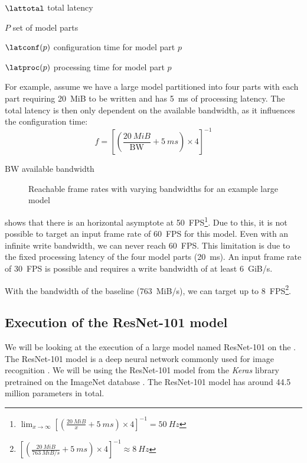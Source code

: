 \begin{eqexpl}[15mm]
    \item{$\lattotal$} total latency
    \item{$P$} set of model parts
    \item{$\latconf(p)$} configuration time for model part $p$
    \item{$\latproc(p)$} processing time for model part $p$
\end{eqexpl}

For example, assume we have a large model partitioned into four parts with each part requiring \SI{20}{MiB} to be written and has \SI{5}{ms} of processing latency.
The total latency is then only dependent on the available bandwidth, as it influences the configuration time:
\begin{equation*}
    f = \left[ \left( \frac{\SI{20}{MiB}}{\textrm{BW}} + \SI{5}{ms} \right) \times 4 \right]^{-1}
\end{equation*}

\begin{eqexpl}[15mm]
    \item{$\textrm{BW}$} available bandwidth
\end{eqexpl}

\begin{figure}
    \centering
    
    \caption{Reachable frame rates with varying bandwidths for an example large model}
    \label{fig:large_model_bandwidth_analysis_example}
\end{figure}

 shows that there is an horizontal asymptote at \SI{50}{FPS}\footnote{ $\lim_{x \to \infty} \left[ \left( \frac{\SI{20}{MiB}}{x} + \SI{5}{ms} \right) \times 4 \right]^{-1} = \SI{50}{Hz}$}.
Due to this, it is not possible to target an input frame rate of \SI{60}{FPS} for this model.
Even with an infinite write bandwidth, we can never reach \SI{60}{FPS}.
This limitation is due to the fixed processing latency of the four model parts (\SI{20}{ms}).
An input frame rate of \SI{30}{FPS} is possible and requires a write bandwidth of at least \SI{6}{GiB/s}.

With the bandwidth of the baseline \confignoc{} (\SI{763}{MiB/s}), we can target up to \SI{8}{FPS}\footnote{$\left[ \left( \frac{\SI{20}{MiB}}{\SI{763}{MiB/s}} + \SI{5}{ms} \right) \times 4 \right]^{-1} \approx \SI{8}{Hz}$}.

\subsection{Execution of the ResNet-101 model}
We will be looking at the execution of a large model named ResNet-101 on the \graicore{}.
The ResNet-101 model is a deep neural network commonly used for image recognition \autocite{heDeepResidualLearning2015}.
We will be using the ResNet-101 model from the \textit{Keras} library \cite{chollet2015keras} pretrained on the ImageNet database \cite{russakovskyImageNetLargeScale2014}.
The ResNet-101 model has around 44.5 million parameters in total.


